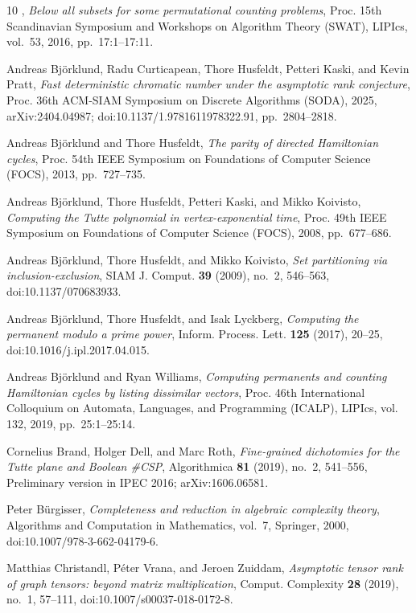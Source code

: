 \documentclass[10pt]{amsart}
\theoremstyle{plain}
\theoremstyle{definition}
\theoremstyle{remark}
\numberwithin{equation}{section}
\begin{document}
\begin{thebibliography}{10}
\bysame, \emph{Below all subsets for some permutational counting problems},
  Proc. 15th Scandinavian Symposium and Workshops on Algorithm Theory (SWAT),
  LIPIcs, vol.~53, 2016, pp.~17:1--17:11.

Andreas Bj{\"o}rklund, Radu Curticapean, Thore Husfeldt, Petteri Kaski, and
  Kevin Pratt, \emph{Fast deterministic chromatic number under the asymptotic
  rank conjecture}, Proc. 36th ACM-SIAM Symposium on Discrete Algorithms
  (SODA), 2025, arXiv:2404.04987; doi:10.1137/1.9781611978322.91,
  pp.~2804--2818.

Andreas Bj{\"o}rklund and Thore Husfeldt, \emph{The parity of directed
  {H}amiltonian cycles}, Proc. 54th IEEE Symposium on Foundations of Computer
  Science (FOCS), 2013, pp.~727--735.

Andreas Bj{\"o}rklund, Thore Husfeldt, Petteri Kaski, and Mikko Koivisto,
  \emph{Computing the {T}utte polynomial in vertex-exponential time}, Proc.
  49th IEEE Symposium on Foundations of Computer Science (FOCS), 2008,
  pp.~677--686.

Andreas Bj{\"o}rklund, Thore Husfeldt, and Mikko Koivisto, \emph{Set
  partitioning via inclusion-exclusion}, SIAM J. Comput. \textbf{39} (2009),
  no.~2, 546--563, doi:10.1137/070683933.

Andreas Bj{\"o}rklund, Thore Husfeldt, and Isak Lyckberg, \emph{Computing the
  permanent modulo a prime power}, Inform. Process. Lett. \textbf{125} (2017),
  20--25, doi:10.1016/j.ipl.2017.04.015.

Andreas Bj{\"o}rklund and Ryan Williams, \emph{Computing permanents and
  counting {H}amiltonian cycles by listing dissimilar vectors}, Proc. 46th
  International Colloquium on Automata, Languages, and Programming (ICALP),
  LIPIcs, vol. 132, 2019, pp.~25:1--25:14.

Cornelius Brand, Holger Dell, and Marc Roth, \emph{Fine-grained dichotomies for
  the {T}utte plane and {B}oolean \#{CSP}}, Algorithmica \textbf{81} (2019),
  no.~2, 541--556, Preliminary version in IPEC 2016; arXiv:1606.06581.

Peter B{\"u}rgisser, \emph{Completeness and reduction in algebraic complexity
  theory}, Algorithms and Computation in Mathematics, vol.~7, Springer, 2000,
  doi:10.1007/978-3-662-04179-6.

Matthias Christandl, P{\'e}ter Vrana, and Jeroen Zuiddam, \emph{Asymptotic
  tensor rank of graph tensors: beyond matrix multiplication}, Comput.
  Complexity \textbf{28} (2019), no.~1, 57--111, doi:10.1007/s00037-018-0172-8.


\end{thebibliography}
\end{document}
